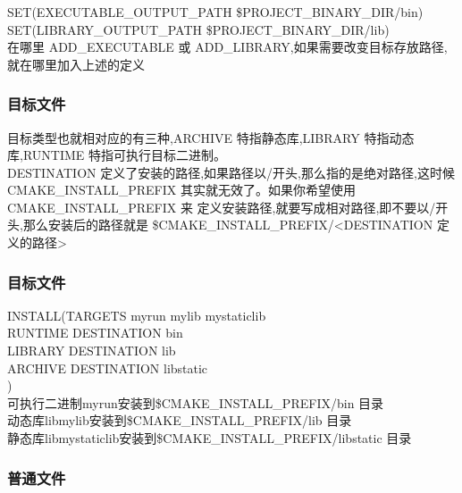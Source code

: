 \documentclass{beamer}
\begin{document}
\begin{CJK}{UTF8}{gkai}
  \begin{frame}\frametitle{}
    SET(EXECUTABLE\_OUTPUT\_PATH \${PROJECT\_BINARY\_DIR}/bin)\\
    SET(LIBRARY\_OUTPUT\_PATH \${PROJECT\_BINARY\_DIR}/lib)\\
    在哪里 ADD\_EXECUTABLE 或 ADD\_LIBRARY,如果需要改变目标存放路径,就在哪里加入上述的定义
  \end{frame}

  \begin{frame}\frametitle{目标文件}
    目标类型也就相对应的有三种,ARCHIVE 特指静态库,LIBRARY 特指动态库,RUNTIME
    特指可执行目标二进制。\\
    DESTINATION 定义了安装的路径,如果路径以/开头,那么指的是绝对路径,这时候
    CMAKE\_INSTALL\_PREFIX 其实就无效了。如果你希望使用 CMAKE\_INSTALL\_PREFIX 来
    定义安装路径,就要写成相对路径,即不要以/开头,那么安装后的路径就是
    \${CMAKE\_INSTALL\_PREFIX}/<DESTINATION 定义的路径>
  \end{frame}

  \begin{frame}\frametitle{目标文件}
    INSTALL(TARGETS myrun mylib mystaticlib\\
    RUNTIME DESTINATION bin\\
    LIBRARY DESTINATION lib\\
    ARCHIVE DESTINATION libstatic\\
    )\\
    可执行二进制myrun安装到\${CMAKE\_INSTALL\_PREFIX}/bin 目录\\
    动态库libmylib安装到\${CMAKE\_INSTALL\_PREFIX}/lib 目录\\
    静态库libmystaticlib安装到\${CMAKE\_INSTALL\_PREFIX}/libstatic 目录\\
  \end{frame}

  \begin{frame}\frametitle{普通文件}
  \end{frame}


\end{CJK}
\end{document}
